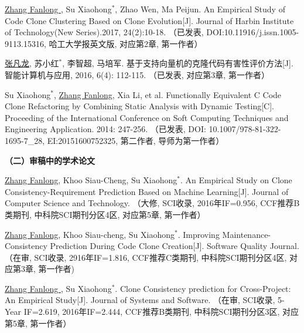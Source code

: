 \begin{publist}
\item
\underline{Zhang Fanlong }, Su Xiaohong{$^*$},  Zhao Wen,  Ma Peijun. An Empirical Study of Code Clone Clustering Based on Clone Evolution[J]. Journal of Harbin Institute of Technology(New Series).2017, 24(2):10-18.
（已发表, DOI:10.11916/j.issn.1005-9113.15316, 哈工大学报英文版, 对应第2章, 第一作者）

\item
\underline{张凡龙}, 苏小红{$^*$},  李智超,  马培军. 基于支持向量机的克隆代码有害性评价方法[J]. 智能计算机与应用, 2016, 6(4): 112-115. 
（已发表, 对应第3章, 第一作者）

\item
Su Xiaohong{$^*$}, \underline{Zhang Fanlong},  Xia Li, et al. Functionally Equivalent C Code Clone Refactoring by Combining Static Analysis with Dynamic Testing[C]. Proceeding of the International Conference on Soft Computing Techniques and Engineering Application. 2014: 247-256.
（已发表, DOI: 10.1007/978-81-322-1695-7\_28, EI:20151600752325, 第二作者, 导师为第一作者）
\end{publist}

\noindent\textbf{（二）审稿中的学术论文}
\begin{publist}

\item
\underline{Zhang Fanlong},  Khoo Siau-Cheng, Su Xiaohong{$^*$}. An Empirical Study on Clone Consistency-Requirement Prediction Based on Machine Learning[J]. Journal of Computer Science and Technology.
（大修, SCI收录, 2016年IF=0.956, CCF推荐B类期刊, 中科院SCI期刊分区4区, 对应第5章, 第一作者）

\item
\underline{Zhang Fanlong}, Khoo Siau-cheng, Su Xiaohong{$^*$}. Improving Maintenance-Consistency Prediction During Code Clone Creation[J]. Software Quality Journal. 
（在审, SCI收录, 2916年IF=1.816, CCF推荐C类期刊, 中科院SCI期刊分区4区, 对应第3章, 第一作者)

\item
\underline{Zhang Fanlong }, Su Xiaohong{$^*$}. Clone Consistency prediction for Cross-Project: An Empirical Study[J]. Journal of Systems and Software.
（在审, SCI收录, 5-Year IF=2.619, 2016年IF=2.444, CCF推荐B类期刊, 中科院SCI期刊分区3区, 对应第5章, 第一作者）



\end{publist}

